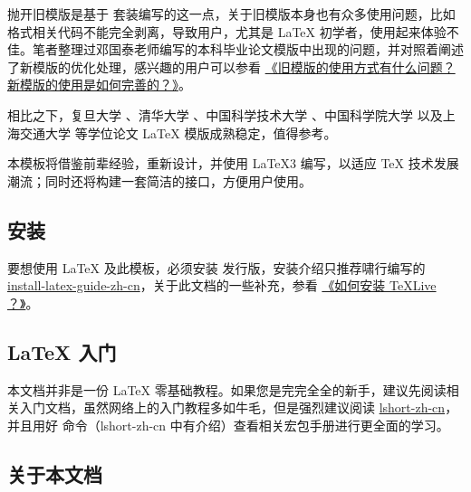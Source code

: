 \documentclass{ccnudoc}
\begin{document}
抛开旧模版是基于 \CTeX 套装编写的这一点，关于旧模版本身也有众多使用问题，比如格式相关代码不能完全剥离，导致用户，尤其是 \LaTeX{} 初学者，使用起来体验不佳。笔者整理过邓国泰老师编写的本科毕业论文模版中出现的问题，并对照着阐述了新模版的优化处理，感兴趣的用户可以参看 \href{https://gitee.com/xkwxdyy/CCNUthesis/wikis/%E5%B8%B8%E8%A7%81%E9%97%AE%E9%A2%98FAQ/%E6%97%A7%E6%A8%A1%E7%89%88%E7%9A%84%E4%BD%BF%E7%94%A8%E6%96%B9%E5%BC%8F%E6%9C%89%E4%BB%80%E4%B9%88%E9%97%AE%E9%A2%98%EF%BC%9F%E6%96%B0%E6%A8%A1%E7%89%88%E7%9A%84%E4%BD%BF%E7%94%A8%E6%98%AF%E5%A6%82%E4%BD%95%E5%AE%8C%E5%96%84%E7%9A%84%EF%BC%9F}{《旧模版的使用方式有什么问题？新模版的使用是如何完善的？》}。

相比之下，复旦大学 、清华大学 、中国科学技术大学 、中国科学院大学  以及上海交通大学  等学位论文 \LaTeX{} 模版成熟稳定，值得参考。

本模板将借鉴前辈经验，重新设计，并使用 \LaTeX3 编写，以适应 \TeX{} 技术发展潮流；同时还将构建一套简洁的接口，方便用户使用。


\subsection{\TeXLive 安装}

要想使用 \LaTeX{} 及此模板，必须安装 \TeXLive 发行版，安装介绍只推荐啸行编写的 \href{https://ctan.math.illinois.edu/info/install-latex-guide-zh-cn/install-latex-guide-zh-cn.pdf}{install-latex-guide-zh-cn}，关于此文档的一些补充，参看 \href{https://gitee.com/xkwxdyy/CCNUthesis/wikis/%E5%B8%B8%E8%A7%81%E9%97%AE%E9%A2%98FAQ/%E5%A6%82%E4%BD%95%E5%AE%89%E8%A3%85TeXLive}{《如何安装 TeXLive ？》}。


\subsection{\LaTeX{} 入门}

本文档并非是一份 \LaTeX{} 零基础教程。如果您是完完全全的新手，建议先阅读相关入门文档，虽然网络上的入门教程多如牛毛，但是强烈建议阅读 \href{https://ctan.math.illinois.edu/info/lshort/chinese/lshort-zh-cn.pdf}{lshort-zh-cn}，并且用好  命令（lshort-zh-cn 中有介绍）查看相关宏包手册进行更全面的学习。


\subsection{关于本文档} \label{subsec:提issues}
\end{document}
